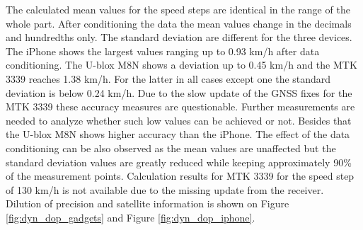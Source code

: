 \documentclass{article}
\begin{document}
			The calculated mean values for the speed steps are identical in the range of the whole part. After conditioning the data the mean values change in the decimals and hundredths only. The standard deviation are different for the three devices. The iPhone shows the largest values ranging up to 0.93 km/h after data conditioning. The U-blox M8N shows a deviation up to 0.45 km/h and the MTK 3339 reaches 1.38 km/h. For the latter in all cases except one the standard deviation is below 0.24 km/h. Due to the slow update of the GNSS fixes for the MTK 3339 these accuracy measures are questionable. Further measurements are needed to analyze whether such low values can be achieved or not. Besides that the U-blox M8N shows higher accuracy than the iPhone. The effect of the data conditioning can be also observed as the mean values are unaffected but the standard deviation values are greatly reduced while keeping approximately 90\% of the measurement points. Calculation results for MTK 3339 for the speed step of 130 km/h is not available due to the missing update from the receiver. \\
			Dilution of precision and satellite information is shown on Figure \ref{fig:dyn_dop_gadgets} and Figure \ref{fig:dyn_dop_iphone}.
\end{document}
